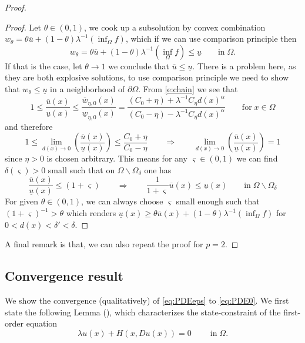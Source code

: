 \documentclass[11pt,reqno]{amsart}
\numberwithin{figure}{section}
\theoremstyle{plain}
\theoremstyle{remark}
\numberwithin{equation}{section}
\begin{document}
\begin{proof}
\begin{proof} Let $\theta\in (0,1)$, we cook up a subsolution by convex combination $w_\theta = \theta \overline{u} + (1-\theta)\lambda^{-1}\left(\inf_{\Omega} f\right)$, which if we can use comparison principle then
\begin{equation*}
    w_\theta = \theta \overline{u} + (1-\theta)\lambda^{-1}\left(\inf_{\Omega} f\right) \leq \underline{u} \qquad\text{in}\;\Omega.
\end{equation*}
If that is the case, let $\theta\to 1$ we conclude that $\overline{u} \leq \underline{u}$. There is a problem here, as they are both explosive solutions, to use comparison principle we need to show that $w_\theta \leq \underline{u}$ in a neighborhood of $\partial\Omega$. From \eqref{e:chain} we see that
\begin{equation*}
    1\leq \frac{\overline{u}(x)}{\underline{u}(x)} \leq \frac{\overline{w}_{\eta,0}(x)}{\underline{w}_{\eta,0}(x)} = \frac{(C_0+\eta)+\lambda^{-1}C_\eta d(x)^\alpha}{(C_0-\eta)-\lambda^{-1}C_\eta d(x)^\alpha} \qquad\text{for}\;x\in \Omega
\end{equation*}
and therefore
\begin{equation*}
   1\leq  \lim_{d(x)\to 0} \left(\frac{\overline{u}(x)}{\underline{u}(x)}\right) \leq \frac{C_0+\eta}{C_0-\eta} \qquad\Longrightarrow\qquad  \lim_{d(x)\to 0} \left(\frac{\overline{u}(x)}{\underline{u}(x)}\right) = 1
\end{equation*}
since $\eta>0$ is chosen arbitrary. This means for any $\varsigma\in(0,1)$ we can find $\delta(\varsigma)>0$ small such that on $\Omega\backslash \Omega_\delta$ one has
\begin{equation*}
\frac{\overline{u}(x)}{\underline{u}(x)}\leq (1+\varsigma)     \qquad\Longrightarrow\qquad \frac{1}{1+\varsigma} \overline{u}(x) \leq \underline{u}(x) \qquad\text{in}\; \Omega\backslash \Omega_\delta
\end{equation*}
For given $\theta\in (0,1)$, we can always choose $\varsigma$ small enough such that $(1+\varsigma)^{-1} > \theta$ which renders $\underline{u}(x) \geq \theta \overline{u}(x) + (1-\theta)\lambda^{-1}\left(\inf_\Omega f\right)$ for $0< d(x) < \delta' < \delta$.
\end{proof}
\noindent A final remark is that, we can also repeat the proof for $p=2$.
\end{proof}
\subsection{Convergence result} We show the convergence (qualitatively) of \eqref{eq:PDEeps} to \eqref{eq:PDE0}. We first state the following Lemma (\cite{Capuzzo-Dolcetta1990}), which characterizes the state-constraint of the first-order equation
\begin{equation}\label{S_0}
 \lambda u(x) + H(x,Du(x)) = 0\;\qquad\text{in}\;\Omega. \tag{$S_0$}
\end{equation}
\end{document}
